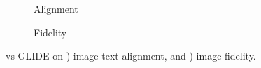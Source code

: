\begin{figure}
    \centering
    \begin{subfigure}[t]{\textwidth}
    
    \caption{Alignment}
    \label{fig:drawit_vs_glide_detailed_alignment_alignment}
    \vspace*{0.5cm}
    \end{subfigure}
    \begin{subfigure}[t]{\textwidth}
    
    \caption{Fidelity}
    \label{fig:drawit_vs_glide_detailed_alignment_fidelity}
    \end{subfigure}
    \caption{\name vs GLIDE on \benchmarkname {}) image-text alignment, and ) image fidelity.}
    \label{fig:drawit_vs_glide_detailed_alignment}
\end{figure}

